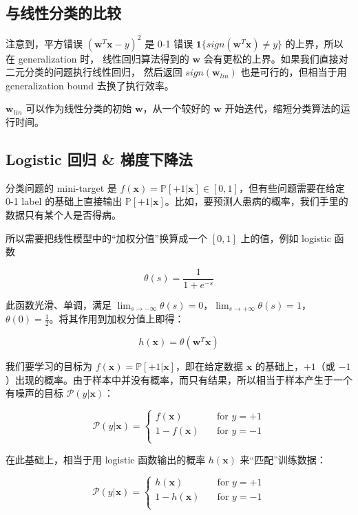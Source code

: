 \documentclass[a4paper]{article}
\begin{document}
\subsection{与线性分类的比较}
注意到，平方错误 $(\mathbf{w}^T\mathbf{x} - y)^2$ 是 0-1 错误 $\mathbf{1}\{sign(\mathbf{w}^T\mathbf{x}) \neq y\}$ 的上界，所以在 generalization 时，
线性回归算法得到的 $\mathbf{w}$ 会有更松的上界。如果我们直接对二元分类的问题执行线性回归，
然后返回 $sign(\mathbf{w}_{lin})$ 也是可行的，但相当于用 generalization bound 去换了执行效率。

$\mathbf{w}_{lin}$ 可以作为线性分类的初始 $\mathbf{w}$，从一个较好的 $\mathbf{w}$ 开始迭代，缩短分类算法的运行时间。


\subsection{Logistic 回归 \& 梯度下降法}
分类问题的 mini-target 是 $f(\mathbf{x}) = \mathbb{P}[+1|\mathbf{x}] \in [0, 1]$，但有些问题需要在给定 0-1 label 的基础上直接输出 $\mathbb{P}[+1|\mathbf{x}]$。比如，要预测人患病的概率，我们手里的数据只有某个人是否得病。

所以需要把线性模型中的“加权分值”换算成一个 $[0, 1]$ 上的值，例如 logistic 函数

$$\theta(s) = \frac{1}{1 + e^{-s}}$$

此函数光滑、单调，满足 $\displaystyle \lim_{s \to -\infty} \theta(s) = 0$，$\displaystyle \lim_{s \to +\infty} \theta(s) = 1$，$\theta(0) = \frac{1}{2}$。将其作用到加权分值上即得：

$$h(\mathbf{x}) = \theta(\mathbf{w}^T\mathbf{x})$$

我们要学习的目标为 $f(\mathbf{x}) = \mathbb{P}[+1|\mathbf{x}]$，即在给定数据 $\mathbf{x}$ 的基础上，$+1$（或 $-1$）出现的概率。由于样本中并没有概率，而只有结果，所以相当于样本产生于一个有噪声的目标 $\mathcal{P}(y|\mathbf{x})$：

\begin{equation}
\mathcal{P}(y|\mathbf{x}) =
\begin{cases}
f(\mathbf{x}) & \quad \text{for } y = +1 \\
1 - f(\mathbf{x}) & \quad \text{for } y = -1 \\
\end{cases}
\end{equation}

在此基础上，相当于用 logistic 函数输出的概率 $h(\mathbf{x})$ 来“匹配”训练数据：

\begin{equation}
\mathcal{P}(y|\mathbf{x}) =
\begin{cases}
h(\mathbf{x}) & \quad \text{for } y = +1 \\
1 - h(\mathbf{x}) & \quad \text{for } y = -1 \\
\end{cases}
\end{equation}
\end{document}
